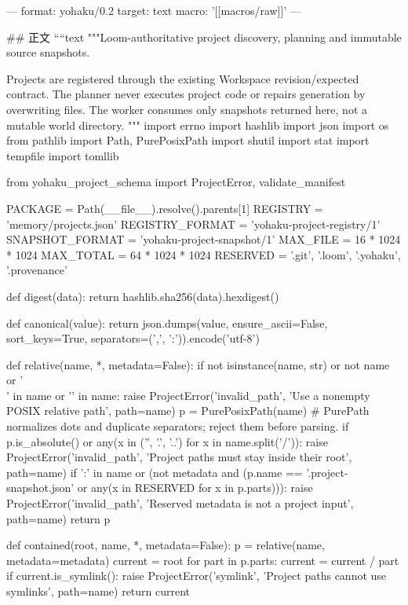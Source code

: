 ---
format: yohaku/0.2
target: text
macro: '[[macros/raw]]'
---

## 正文
````text
"""Loom-authoritative project discovery, planning and immutable source snapshots.

Projects are registered through the existing Workspace revision/expected contract.
The planner never executes project code or repairs generation by overwriting files.
The worker consumes only snapshots returned here, not a mutable world directory.
"""
import errno
import hashlib
import json
import os
from pathlib import Path, PurePosixPath
import shutil
import stat
import tempfile
import tomllib

from yohaku_project_schema import ProjectError, validate_manifest

PACKAGE = Path(__file__).resolve().parents[1]
REGISTRY = 'memory/projects.json'
REGISTRY_FORMAT = 'yohaku-project-registry/1'
SNAPSHOT_FORMAT = 'yohaku-project-snapshot/1'
MAX_FILE = 16 * 1024 * 1024
MAX_TOTAL = 64 * 1024 * 1024
RESERVED = {'.git', '.loom', '.yohaku', '.provenance'}


def digest(data):
    return hashlib.sha256(data).hexdigest()


def canonical(value):
    return json.dumps(value, ensure_ascii=False, sort_keys=True,
                      separators=(',', ':')).encode('utf-8')


def relative(name, *, metadata=False):
    if not isinstance(name, str) or not name or '\\' in name or '\0' in name:
        raise ProjectError('invalid_path', 'Use a nonempty POSIX relative path', path=name)
    p = PurePosixPath(name)
    # PurePath normalizes dots and duplicate separators; reject them before parsing.
    if p.is_absolute() or any(x in ('', '.', '..') for x in name.split('/')):
        raise ProjectError('invalid_path', 'Project paths must stay inside their root', path=name)
    if ':' in name or (not metadata and (p.name == '.project-snapshot.json' or any(x in RESERVED for x in p.parts))):
        raise ProjectError('invalid_path', 'Reserved metadata is not a project input', path=name)
    return p


def contained(root, name, *, metadata=False):
    p = relative(name, metadata=metadata)
    current = root
    for part in p.parts:
        current = current / part
        if current.is_symlink():
            raise ProjectError('symlink', 'Project paths cannot use symlinks', path=name)
    return current


